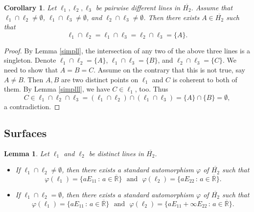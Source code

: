 \documentclass[10pt]{amsart}
\newtheorem{lemma}[theorem]{Lemma}
\newtheorem{corollary}[theorem]{Corollary}
\theoremstyle{definition}
\theoremstyle{remark}
\numberwithin{subsection}{section}
\numberwithin{equation}{section}
\newcommand\oH{{\overline{H_2}}}
\newcommand\oR{{\overline{\mathbb{R}}}}
\begin{document}
\begin{corollary}\label{triangle}
Let $\ell_1 , \ell_2 , \ell_3$ be pairwise different lines in $\oH$.  Assume that $\ell_1 \cap \ell_2 \not= \emptyset$, 
$\ell_1 \cap \ell_3 \not= \emptyset$,  and $\ell_2 \cap \ell_3 \not= \emptyset$. Then there exists $A \in \oH$ such that
\[
\ell_1 \cap \ell_2 = \ell_1 \cap \ell_3 =\ell_2 \cap \ell_3  = \{ A \}.
\]
\end{corollary}

\begin{proof}
By  Lemma \ref{simpll}, the intersection of any two  of the above three lines is a singleton. Denote $\ell_1 \cap \ell_2 = \{ A \}$,  $\ell_1 \cap \ell_3 = \{ B \}$, and $ \ell_2 \cap \ell_3  = \{ C \}$. We need to show that $A=B=C$. Assume on the contrary that this is not true, say $A\not=B$. Then $A,B$ are two distinct points on $\ell_1$ and $C$ is coherent to both of them. By Lemma \ref{simplll}, we have $C \in \ell_1$, too. 
Thus 
\[
C\in \ell_1\cap \ell_2\cap \ell_3 = (\ell_1\cap \ell_2)\cap (\ell_1 \cap \ell_3)=\{A\}\cap\{B\} = \emptyset,
\]
a contradiction.
\end{proof}


\subsection{Surfaces}\label{ssss}
\begin{lemma}\label{herz}
Let $\ell_1$ and $\ell_2$ be distinct lines in $\oH$.
\begin{itemize}
\item If $\ell_1 \cap \ell_2 \not= \emptyset$, then there exists a standard automorphism $\varphi$ of $\oH$ such that
\[
\varphi ( \ell_1) = \{ a E_{11} \, : \, a \in {\oR} \} \ \ \ \text{and} \ \ \ \varphi ( \ell_2) = \{ a E_{22} \, : \, a \in {\oR} \}.
\]
\item   If $\ell_1 \cap \ell_2 = \emptyset$, then there exists a standard automorphism $\varphi$ of $\oH$ such that
\[
\varphi ( \ell_1) = \{ a E_{11} \, : \, a \in {\oR} \} \ \ \ \text{and} \ \ \ \varphi ( \ell_2) = \{  a E_{11}+\infty E_{22}  \, : \, a \in {\oR} \}.
\]
\end{itemize}
\end{lemma}
\end{document}
